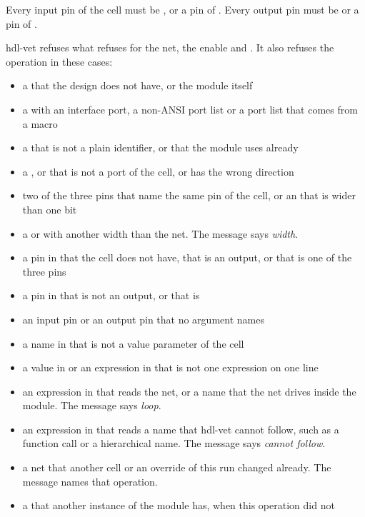 \begin{entry}{}
  Every input pin of the cell must be ,  or a pin of
  . Every output pin must be  or a pin of .
\item[Refused] hdl-vet refuses what  refuses for the net, the
  enable and . It also refuses the operation in these cases:
  \begin{itemize}
  \item a  that the design does not have, or the module itself
  \item a  with an interface port, a non-ANSI port list or a port list that comes
    from a macro
  \item a  that is not a plain identifier, or that the module uses already
  \item a ,  or  that is not a port of the
    cell, or has the wrong direction
  \item two of the three pins that name the same pin of the cell, or an 
    that is wider than one bit
  \item a  or  with another width than the net. The message says
    \emph{width}.
  \item a pin in  that the cell does not have, that is an output, or that is
    one of the three pins
  \item a pin in  that is not an output, or that is 
  \item an input pin or an output pin that no argument names
  \item a name in  that is not a value parameter of the cell
  \item a value in  or an expression in  that is not one
    expression on one line
  \item an expression in  that reads the net, or a name that the net drives
    inside the module. The message says \emph{loop}.
  \item an expression in  that reads a name that hdl-vet cannot follow, such
    as a function call or a hierarchical name. The message says \emph{cannot follow}.
  \item a net that another cell or an override of this run changed already. The message names
    that operation.
  \item a  that another instance of the module has, when this operation did not

\end{itemize}
\end{entry}

